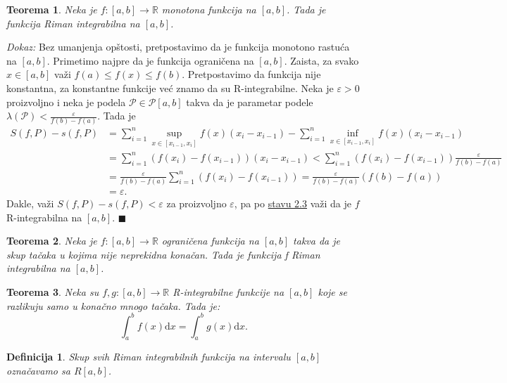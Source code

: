 \documentclass{article}
\newtheorem{definicija}{Definicija}[section]
\newtheorem{teorema}{Teorema}[section]
\begin{document}
\begin{teoremabox}
    \begin{teorema}
        Neka je $f: [a, b] \longrightarrow \mathbb{R}$ monotona funkcija na $[a, b]$. Tada je funkcija Riman integrabilna na $[a, b]$.
    \end{teorema}
\end{teoremabox}
\textit{Dokaz:} Bez umanjenja opštosti, pretpostavimo da je funkcija monotono rastuća na $[a, b]$.
Primetimo najpre da je funkcija ograničena na $[a,b]$. Zaista, za svako $x \in [a, b]$ važi $f(a) \leq f(x) \leq f(b)$.
Pretpostavimo da funkcija nije konstantna, za konstantne funkcije već znamo da su R-integrabilne.
Neka je $\varepsilon > 0$ proizvoljno i neka je podela $\mathcal{P} \in \mathcal{P}[a, b]$ takva da je parametar podele
$\lambda(\mathcal{P}) < \frac{\varepsilon}{f(b) - f(a)}$. Tada je
\begin{align*}
    S(f, P) - s(f, P) & = \sum^n_{i = 1}\sup_{x\in[x_{i-1}, x_i]}f(x)(x_i - x_{i-1}) - \sum^n_{i = 1}\inf_{x\in[x_{i-1}, x_i]}f(x)(x_i - x_{i-1}) \\
                      & = \sum_{i=1}^n(f(x_i)-f(x_{i-1}))(x_i - x_{i-1}) < \sum^n_{i=1}(f(x_i) - f(x_{i-1}))\frac{\varepsilon}{f(b) - f(a)}       \\
                      & = \frac{\varepsilon}{f(b) - f(a)}\sum^n_{i=1}(f(x_i) - f(x_{i-1})) = \frac{\varepsilon}{f(b) - f(a)} (f(b) - f(a))        \\
                      & = \varepsilon.
\end{align*}
Dakle, važi $S(f, P) - s(f, P)<\varepsilon$ za proizvoljno $\varepsilon$, pa po \hyperref[Stav_2.3]{stavu 2.3} važi da je $f$
R-integrabilna na $[a,b]$.
\null\hfill $\blacksquare$\par
\begin{teoremabox}
    \begin{teorema}
        Neka je $f:[a, b] \longrightarrow \mathbb{R}$ ograničena funkcija na $[a, b]$ takva da je skup tačaka u kojima nije neprekidna konačan. Tada je funkcija f Riman integrabilna na $[a, b]$.
    \end{teorema}
\end{teoremabox}
\begin{teoremabox}
    \begin{teorema}
        Neka su $f, g: [a, b] \longrightarrow \mathbb{R}$ R-integrabilne funkcije na $[a, b]$ koje se razlikuju samo u konačno mnogo tačaka. Tada je:
        $$\displaystyle \int_a^b f(x)\text{d}x = \int_a^b g(x)\text{d}x.$$
    \end{teorema}
\end{teoremabox}
\begin{defbox}
    \begin{definicija}
        Skup svih Riman integrabilnih funkcija na intervalu $[a,b]$ označavamo sa $R[a, b]$.
    \end{definicija}
\end{defbox}
\end{document}
